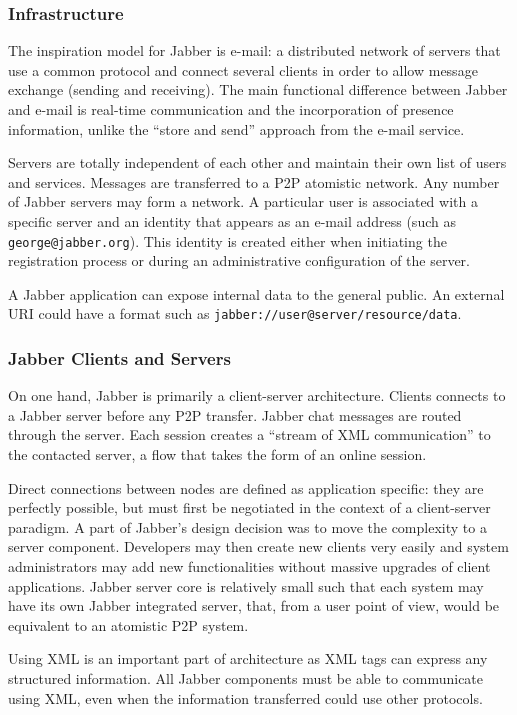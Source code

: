 \subsubsection{Infrastructure}

The inspiration model for Jabber is e-mail: a distributed network of servers
that use a common protocol and connect several clients in order to allow
message exchange (sending and receiving). The main functional difference
between Jabber and e-mail is real-time communication and the incorporation of
presence information, unlike the ``store and send'' approach from the e-mail
service.

Servers are totally independent of each other and maintain their own list of
users and services. Messages are transferred to a P2P atomistic network. Any
number of Jabber servers may form a network. A particular user is associated
with a specific server and an identity that appears as an e-mail address
(such as \texttt{george@jabber.org}). This identity is created either when
initiating the registration process or during an administrative configuration
of the server.

A Jabber application can expose internal data to the general public. An
external URI could have a format such as
\texttt{jabber://user@server/resource/data}.

\subsubsection{Jabber Clients and Servers}

On one hand, Jabber is primarily a client-server architecture. Clients
connects to a Jabber server before any P2P transfer. Jabber chat
messages are routed through the server. Each session creates a ``stream of XML
communication'' to the contacted server, a flow that takes the form of an
online session.

Direct connections between nodes are defined as application specific: they are
perfectly possible, but must first be negotiated in the context of
a client-server paradigm. A part of Jabber's design decision was to move the
complexity to a server component. Developers may then create new clients very
easily and system administrators may add new functionalities without
massive upgrades of client applications. Jabber server core is relatively
small such that each system may have its own Jabber integrated server, that,
from a user point of view, would be equivalent to an atomistic P2P system.

Using XML is an important part of architecture as XML tags can express any
structured information. All Jabber components must be able to communicate using
XML, even when the information transferred could use other protocols.

